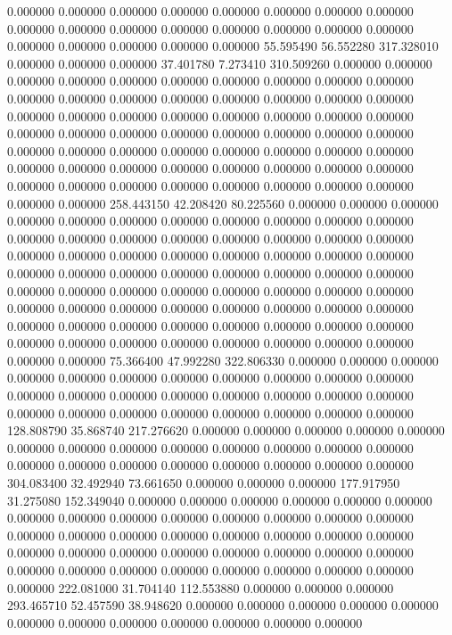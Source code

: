 0.000000 0.000000 0.000000
0.000000 0.000000 0.000000
0.000000 0.000000 0.000000
0.000000 0.000000 0.000000
0.000000 0.000000 0.000000
0.000000 0.000000 0.000000
0.000000 0.000000 0.000000
55.595490 56.552280 317.328010
0.000000 0.000000 0.000000
37.401780 7.273410 310.509260
0.000000 0.000000 0.000000
0.000000 0.000000 0.000000
0.000000 0.000000 0.000000
0.000000 0.000000 0.000000
0.000000 0.000000 0.000000
0.000000 0.000000 0.000000
0.000000 0.000000 0.000000
0.000000 0.000000 0.000000
0.000000 0.000000 0.000000
0.000000 0.000000 0.000000
0.000000 0.000000 0.000000
0.000000 0.000000 0.000000
0.000000 0.000000 0.000000
0.000000 0.000000 0.000000
0.000000 0.000000 0.000000
0.000000 0.000000 0.000000
0.000000 0.000000 0.000000
0.000000 0.000000 0.000000
0.000000 0.000000 0.000000
0.000000 0.000000 0.000000
258.443150 42.208420 80.225560
0.000000 0.000000 0.000000
0.000000 0.000000 0.000000
0.000000 0.000000 0.000000
0.000000 0.000000 0.000000
0.000000 0.000000 0.000000
0.000000 0.000000 0.000000
0.000000 0.000000 0.000000
0.000000 0.000000 0.000000
0.000000 0.000000 0.000000
0.000000 0.000000 0.000000
0.000000 0.000000 0.000000
0.000000 0.000000 0.000000
0.000000 0.000000 0.000000
0.000000 0.000000 0.000000
0.000000 0.000000 0.000000
0.000000 0.000000 0.000000
0.000000 0.000000 0.000000
0.000000 0.000000 0.000000
0.000000 0.000000 0.000000
0.000000 0.000000 0.000000
0.000000 0.000000 0.000000
0.000000 0.000000 0.000000
0.000000 0.000000 0.000000
75.366400 47.992280 322.806330
0.000000 0.000000 0.000000
0.000000 0.000000 0.000000
0.000000 0.000000 0.000000
0.000000 0.000000 0.000000
0.000000 0.000000 0.000000
0.000000 0.000000 0.000000
0.000000 0.000000 0.000000
0.000000 0.000000 0.000000
0.000000 0.000000 0.000000
128.808790 35.868740 217.276620
0.000000 0.000000 0.000000
0.000000 0.000000 0.000000
0.000000 0.000000 0.000000
0.000000 0.000000 0.000000
0.000000 0.000000 0.000000
0.000000 0.000000 0.000000
0.000000 0.000000 0.000000
304.083400 32.492940 73.661650
0.000000 0.000000 0.000000
177.917950 31.275080 152.349040
0.000000 0.000000 0.000000
0.000000 0.000000 0.000000
0.000000 0.000000 0.000000
0.000000 0.000000 0.000000
0.000000 0.000000 0.000000
0.000000 0.000000 0.000000
0.000000 0.000000 0.000000
0.000000 0.000000 0.000000
0.000000 0.000000 0.000000
0.000000 0.000000 0.000000
0.000000 0.000000 0.000000
0.000000 0.000000 0.000000
0.000000 0.000000 0.000000
222.081000 31.704140 112.553880
0.000000 0.000000 0.000000
293.465710 52.457590 38.948620
0.000000 0.000000 0.000000
0.000000 0.000000 0.000000
0.000000 0.000000 0.000000
0.000000 0.000000 0.000000
